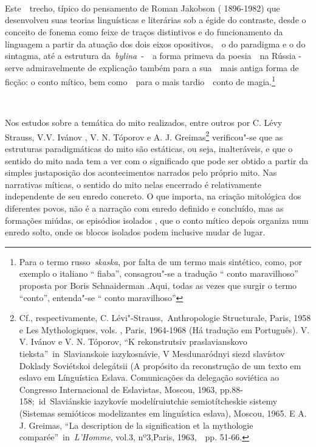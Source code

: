 ~

~

~

Este~~trecho, típico do pensamento de Roman Jakobson ( 1896-1982) que
desenvolveu suas teorias linguísticas e literárias sob a égide do
contraste, desde o conceito de fonema como feixe de traços distintivos e
do funcionamento da linguagem a partir da atuação dos dois eixos
opositivos,~~o do paradigma e o do sintagma, até a estrutura
da~\emph{bylina}~-~~a forma primeva da poesia~~na Rússia - serve
admiravelmente de explicação também para a sua~~mais antiga forma de
ficção: o conto mítico, bem como~~para o mais tardio~~conto de
magia.\footnote{Para o termo russo~\emph{skaska}, por falta de um termo
  mais sintético, como, por exemplo o italiano `` fiaba'', consagrou"-se
  a tradução `` conto maravilhoso'' proposta por Boris Schnaiderman
  .Aqui, todas as vezes que surgir o termo ``conto'', entenda"-se ``
  conto maravilhoso''}

~

Nos estudos sobre a temática do mito realizados, entre outros por C.
Lévy Strauss, V.V. Ivánov , V. N. Tóporov e A. J. Greimas\footnote{Cf.,
  respectivamente, C. Lévi"-Strauss,~{Anthropologie Structurale}, Paris,
  1958 e Les Mythologiques, vols. , Paris, 1964-1968 (Há tradução
  em Português). V. V. Ivánov e V. N. Tóporov, ``K rekonstrutsiv
  praslavianskovo tieksta''~{in}~Slavianskoie iazykosnávie, V
  Mesdunaródnyi siezd slavístov Doklady Soviétskoi delegátsii (A
  propósito da reconstrução de um texto em eslavo em Línguística Eslava.
  Comunicações da delegação soviética ao  Congresso Internacional de
  Eslavistas, Moscou, 1963, pp.88-158;~{id}~Slaviánskie iazykovíe
  modelíruiutchie semiotítcheskie sistemy (Sistemas semióticos
  modelizantes em linguística eslava), Moscou, 1965. E A. J. Greimas,
  ``La description de la signification et la mythologie
  comparée''~{in}~\emph{{L'Homme}}, vol.3, nº3,Paris, 1963,~~pp. 51-66.}
verificou"-se que as estruturas paradigmáticas do mito são estáticas, ou
seja, inalteráveis, e que o sentido do mito nada tem a ver com o
significado que pode ser obtido a partir da simples justaposição dos
acontecimentos narrados pelo próprio mito. Nas narrativas míticas, o
sentido do mito nelas encerrado é relativamente independente de seu
enredo concreto. O que importa, na criação mitológica dos diferentes
povos, não é a narração com enredo definido e concluído, mas as
formações miúdas, os episódios isolados , que o conto mítico depois
organiza num enredo solto, onde os blocos isolados podem inclusive mudar
de lugar.

